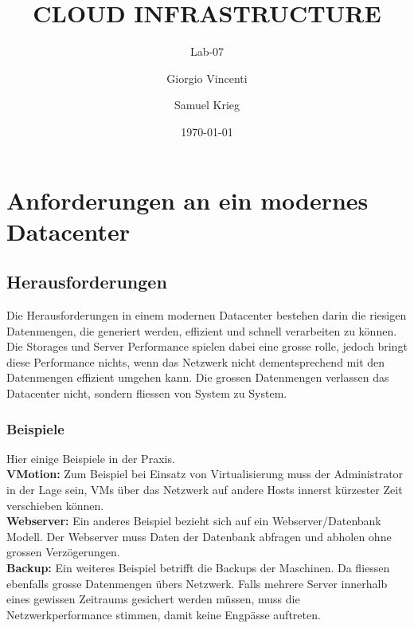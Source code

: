 \documentclass[a4,12pt]{scrartcl}
\title{CLOUD INFRASTRUCTURE}
\subtitle{Lab-07}
\author{Giorgio Vincenti \and Samuel Krieg}
\date{\today}
\begin{document}
\clearpage\maketitle
\thispagestyle{empty}
\tableofcontents
\newpage


\section{Anforderungen an ein modernes Datacenter}
\subsection{Herausforderungen}
Die Herausforderungen in einem modernen Datacenter bestehen darin die riesigen Datenmengen, die generiert werden, effizient und schnell verarbeiten zu können. Die Storages und Server Performance spielen dabei eine grosse rolle, jedoch bringt diese Performance nichts, wenn das Netzwerk nicht dementsprechend mit den Datenmengen effizient umgehen kann. Die grossen Datenmengen verlassen das Datacenter nicht, sondern fliessen von System zu System.

\subsubsection{Beispiele}
Hier einige Beispiele in der Praxis. \\

\noindent \textbf{VMotion:} Zum Beispiel bei Einsatz von Virtualisierung muss der Administrator in der Lage sein, VMs über das Netzwerk auf andere Hosts innerst kürzester Zeit verschieben können. \\

\noindent \textbf{Webserver:} Ein anderes Beispiel bezieht sich auf ein Webserver/Datenbank Modell. Der Webserver muss Daten der Datenbank abfragen und abholen ohne grossen Verzögerungen.\\

\noindent \textbf{Backup:} Ein weiteres Beispiel betrifft die Backups der Maschinen. Da fliessen ebenfalls grosse Datenmengen übers Netzwerk. Falls mehrere Server innerhalb eines gewissen Zeitraums gesichert werden müssen, muss die Netzwerkperformance stimmen, damit keine Engpässe auftreten. 
\end{document}
